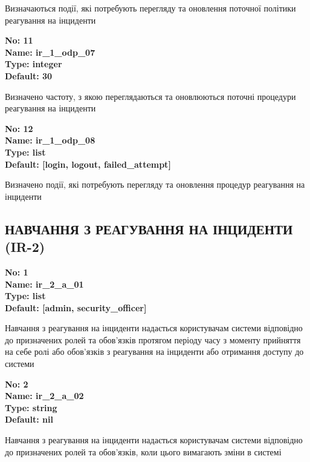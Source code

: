 \documentclass{article}
\begin{document}
{\footnotesize Визначаються події, які потребують перегляду та оновлення поточної політики реагування на інциденти}


{\footnotesize\bfseries
No: 11\\
Name: ir\_\allowbreak{}1\_\allowbreak{}odp\_\allowbreak{}07\\
Type: integer\\
Default: 30
}

{\footnotesize Визначено частоту, з якою переглядаються та оновлюються поточні процедури реагування на інциденти}


{\footnotesize\bfseries
No: 12\\
Name: ir\_\allowbreak{}1\_\allowbreak{}odp\_\allowbreak{}08\\
Type: list\\
Default: [\textquotedbl{}login\textquotedbl{}, \textquotedbl{}logout\textquotedbl{}, \textquotedbl{}failed\_\allowbreak{}attempt\textquotedbl{}]
}

{\footnotesize Визначено події, які потребують перегляду та оновлення процедур реагування на інциденти}




\subsection{НАВЧАННЯ З РЕАГУВАННЯ НА ІНЦИДЕНТИ (IR-2)}


\vspace{10pt}
{\footnotesize\bfseries
No: 1\\
Name: ir\_\allowbreak{}2\_\allowbreak{}a\_\allowbreak{}01\\
Type: list\\
Default: [\textquotedbl{}admin\textquotedbl{}, \textquotedbl{}security\_\allowbreak{}officer\textquotedbl{}]
}

{\footnotesize Навчання з реагування на інциденти надається користувачам системи відповідно до призначених ролей та обов'язків протягом періоду часу з моменту прийняття на себе ролі або обов'язків з реагування на інциденти або отримання доступу до системи}


{\footnotesize\bfseries
No: 2\\
Name: ir\_\allowbreak{}2\_\allowbreak{}a\_\allowbreak{}02\\
Type: string\\
Default: nil
}

{\footnotesize Навчання з реагування на інциденти надається користувачам системи відповідно до призначених ролей та обов'язків, коли цього вимагають зміни в системі}
\end{document}
